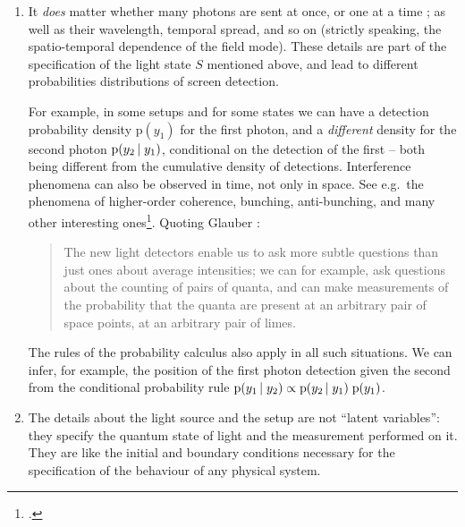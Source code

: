 \documentclass[\ifafour a4paper,12pt,\else a5paper,10pt,\fi%
onecolumn,oneside,article,%
british%
]{memoir}
\theoremstyle{remark}
\theoremstyle{innote}
\newcommand*{\citep}{\parencites}%
\newcommand*{\citey}{\parencites*}
\newcommand*{\pf}{\mathrm{p}}%
\renewcommand*{\|}[1][]{\nonscript\,#1\vert\nonscript\;\mathopen{}}
\newcommand*{\sect}{\S}%
\newcommand*{\eg}{{e.g.}}
\newcommand*{\cf}{{cf.}}
\begin{document}
\begin{enumerate}[label=(\textbf{\roman*})]
\item\label{item:q_details} It \emph{does} matter whether many photons are
  sent at once, or one at a time \citep[\cf][\sect~2
  point~1]{gelmanetal2020}; as well as their wavelength, temporal spread,
  and so on (strictly speaking, the spatio-temporal dependence of the field
  mode). These details are part of the specification of the light state $S$
  mentioned above, and lead to different probabilities distributions of
  screen detection.

  For example, in some setups and for some states we can have a detection
  probability density $\pf(y_{1})$ for the first photon, and a
  \emph{different} density for the second photon $\pf(y_{2} \| y_{1})$,
  conditional on the detection of the first -- both being different from
  the cumulative density of detections. Interference phenomena can also be
  observed in time, not only in space. See \eg\ the phenomena of
  higher-order coherence, bunching, anti-bunching, and many other
  interesting ones\footnote{\label{fn:ref_interf}\cites[for
    example][]{mandeletal1965,morganetal1966,paul1982,jacobsonetal1995}[and
    textbooks such
    as][]{loudon1973_r2000,mandeletal1995_r2008,scullyetal1997_r2001,gerryetal2005,wallsetal1994}.}.
  Quoting Glauber \citey[Lect.~I p.~65]{glauber1965}:
  \begin{quote}\footnotesize
    The new light detectors enable us to ask more subtle questions than
    just ones about average intensities; we can for example, ask questions
    about the counting of pairs of quanta, and can make measurements of the
    probability that the quanta are present at an arbitrary pair of space
    points, at an arbitrary pair of limes.
  \end{quote}
  The rules of the probability calculus also apply in all such situations.
  We can infer, for example, the position of the first photon detection
  given the second from the conditional probability rule
  $\pf(y_{1} \| y_{2}) \propto \pf(y_{2} \| y_{1})\;\pf(y_{1})$.
  

\item\label{item:latent_vars} The details about the light source and the
  setup are not \enquote{latent variables}: they specify the quantum state
  of light and the measurement performed on it. They are like the initial
  and boundary conditions necessary for the specification of the behaviour
  of any physical system. %


\end{enumerate}
\end{document}
